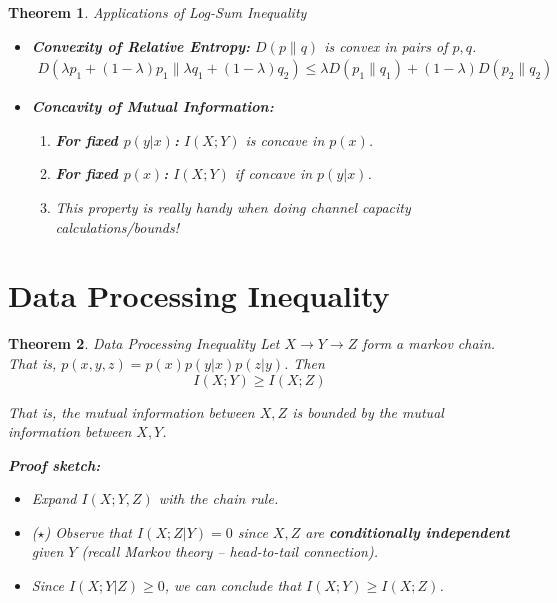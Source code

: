 \documentclass[a4paper,12pt]{report}
\newtheorem{theorem}{Theorem}
\begin{document}
\begin{theorem}{Applications of Log-Sum Inequality}

\begin{itemize}
\item \textbf{Convexity of Relative Entropy: } $D(p\|q)$ is convex in pairs of
$p, q$.
	\begin{align}
		D(\lambda p_1 + (1-\lambda) p_1 \| \lambda q_1 + (1-\lambda) q_2) \leq
		\lambda D(p_1 \| q_1) + (1-\lambda) D(p_2 \| q_2)
	\end{align}

\item \textbf{Concavity of Mutual Information: } 
\begin{enumerate}
\item \textbf{For fixed $p(y|x)$:} $I(X; Y)$ is concave in $p(x)$.
\item \textbf{For fixed $p(x)$:} $I(X; Y)$ if concave in $p(y | x)$.
\item \textit{This property is really handy when doing channel capacity
calculations/bounds!} 
\end{enumerate}
\end{itemize}


\end{theorem}









\section{Data Processing Inequality}

\begin{theorem}{Data Processing Inequality}
Let $X \to Y \to Z$ form a markov chain. That is, $p(x,y,z) = p(x)p(y|x)p(z|y)$.
Then 
\begin{equation}
I(X; Y) \geq I(X; Z)
\end{equation}

That is, the mutual information between $X, Z$ is bounded by the mutual
information between $X, Y$.

\textbf{Proof sketch:} 
\begin{itemize}
\item Expand $I(X; Y, Z)$ with the chain rule.
\item ($\star$) Observe that $I(X; Z | Y) = 0$ since $X, Z$ are \textbf{conditionally
independent} given $Y$ (recall Markov theory -- head-to-tail connection).
\item Since $I(X; Y | Z) \geq 0$, we can conclude that $I(X; Y) \geq I(X; Z)$.
\end{itemize}
\end{theorem}
\end{document}
